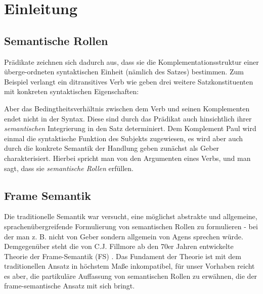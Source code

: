 \documentclass[12pt]{article}
\begin{document}
\newpage
{}

\section{Einleitung}
\subsection{Semantische Rollen}

Prädikate zeichnen sich dadurch aus, dass sie die Komplementationsstruktur einer
überge-ordneten syntaktischen Einheit (nämlich des Satzes) bestimmen. Zum
Beispiel verlangt ein ditransitives Verb wie \glqq{}geben\grqq{} drei weitere Satzkonstituenten mit konkreten syntaktischen Eigenschaften:

\begin{center}
\end{center}

Aber das Bedingtheitsverhältnis zwischen dem Verb und seinen Komplementen 
endet nicht in der Syntax. Diese sind durch das Prädikat auch hinsichtlich ihrer 
\textit{semantischen} Integrierung in den Satz determiniert. Dem Komplement \glqq{}Paul\grqq{}
wird einmal die syntaktische Funktion des Subjekts zugewiesen, es wird aber auch
durch die konkrete Semantik der Handlung \glqq{}geben\grqq{} zunächst als 
\glqq{}Geber\grqq{} charakterisiert. Hierbei spricht man von den Argumenten
eines Verbs, und man sagt, dass sie \textit{semantische Rollen} erfüllen.

\subsection{Frame Semantik}

Die traditionelle Semantik war versucht, eine möglichst abstrakte und
allgemeine, sprachenübergreifende Formulierung von semantischen Rollen zu
formulieren - bei der man z. B. nicht von \glqq{}Geber\grqq{} sondern allgemein
von \glqq{}Agens\grqq{} sprechen würde. Demgegenüber steht die von C.J. Fillmore
ab den 70er Jahren entwickelte Theorie der Frame-Semantik (FS)
\cite{fillmore1985}. Das Fundament der Theorie ist mit dem traditionellen
Ansatz in höchstem Maße inkompatibel, für unser Vorhaben reicht es aber, die
partikuläre Auffassung von semantischen Rollen zu erwähnen, die der
frame-semantische Ansatz mit sich bringt.
\end{document}
